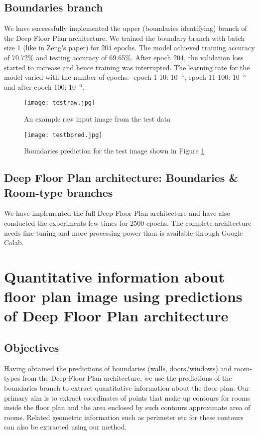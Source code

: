 \documentclass[a4paper]{article}
\begin{document}
\subsection{Boundaries branch}
We have successfully implemented the upper (boundaries identifying) branch of the Deep Floor Plan architecture. We trained the boundary branch with batch size 1 (like in Zeng's paper) for 204 epochs. The model achieved training accuracy of 70.72\% and testing accuracy of 69.65\%. After epoch 204, the validation loss started to increase and hence training was interrupted. The learning rate for the model varied with the number of epochs:- epoch 1-10: 10$^{-4}$, epoch 11-100: 10$^{-5}$ and after epoch 100: 10$^{-6}$. 
\begin{figure}[H]
    \centering
    \texttt{[image: testraw.jpg]}
    \caption{An example raw input image from the test data}
    \label{testraw}
\end{figure}
\begin{figure}[H]
    \centering
    \texttt{[image: testbpred.jpg]}
    \caption{Boundaries prediction for the test image shown in Figure \ref{testraw}}
    \label{testbpred}
\end{figure}
\subsection{Deep Floor Plan architecture: Boundaries \& Room-type branches}
We have implemented the full Deep Floor Plan architecture and have also conducted the experiments few times for 2500 epochs. The complete architecture needs fine-tuning and more processing power than is available through Google Colab.


\section{Quantitative information about floor plan image using predictions of Deep Floor Plan architecture}
\subsection{Objectives}
Having obtained the predictions of boundaries (walls, doors/windows) and room-types from the Deep Floor Plan architecture, we use the predictions of the boundaries branch to extract quantitative information about the floor plan. Our primary aim is to extract coordinates of points that make up contours for rooms inside the floor plan and the area enclosed by such contours approximate area of rooms. Related geometric information such as perimeter etc for these contours can also be extracted using our method.
\end{document}
